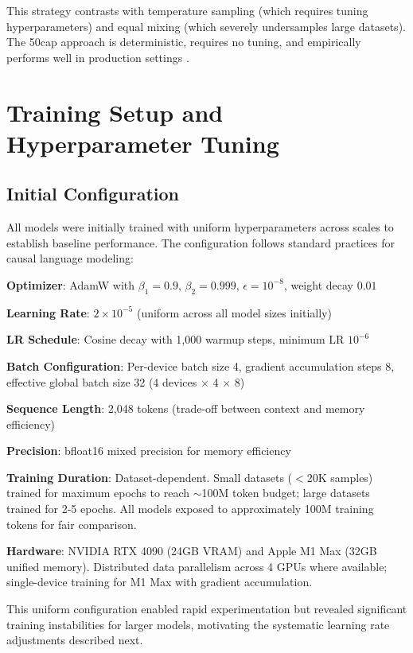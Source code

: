 This strategy contrasts with temperature sampling (which requires tuning hyperparameters) and equal mixing (which severely undersamples large datasets). The 50cap approach is deterministic, requires no tuning, and empirically performs well in production settings \parencite{longpre2023pretrainer}.

\section{Training Setup and Hyperparameter Tuning}

\subsection{Initial Configuration}

All models were initially trained with uniform hyperparameters across scales to establish baseline performance. The configuration follows standard practices for causal language modeling:

\textbf{Optimizer}: AdamW with $\beta_1=0.9$, $\beta_2=0.999$, $\epsilon=10^{-8}$, weight decay $0.01$

\textbf{Learning Rate}: $2 \times 10^{-5}$ (uniform across all model sizes initially)

\textbf{LR Schedule}: Cosine decay with 1,000 warmup steps, minimum LR $10^{-6}$

\textbf{Batch Configuration}: Per-device batch size 4, gradient accumulation steps 8, effective global batch size 32 (4 devices $\times$ 4 $\times$ 8)

\textbf{Sequence Length}: 2,048 tokens (trade-off between context and memory efficiency)

\textbf{Precision}: bfloat16 mixed precision for memory efficiency

\textbf{Training Duration}: Dataset-dependent. Small datasets ($<$20K samples) trained for maximum epochs to reach $\sim$100M token budget; large datasets trained for 2-5 epochs. All models exposed to approximately 100M training tokens for fair comparison.

\textbf{Hardware}: NVIDIA RTX 4090 (24GB VRAM) and Apple M1 Max (32GB unified memory). Distributed data parallelism across 4 GPUs where available; single-device training for M1 Max with gradient accumulation.

This uniform configuration enabled rapid experimentation but revealed significant training instabilities for larger models, motivating the systematic learning rate adjustments described next.

